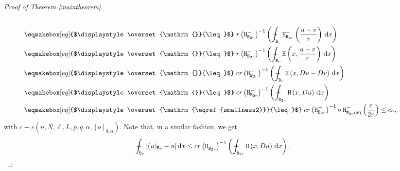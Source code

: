 \documentclass[a4paper]{amsart}
\newcommand{\eqmathbox}[2][eq]{\eqmakebox[#1]{$\displaystyle #2$}}
\theoremstyle{plain}  %
\numberwithin{equation}{section}
\def\dx{\,{\rm d}x}
\newcommand{\mint}{\mathop{\int\hskip -1,05em -\, \!\!\!}\nolimits}
\newcommand{\br}{\tx{B}_{r}}
\newcommand{\brr}{\tx{B}_{2r}}
\newcommand{\ff}{\tx{H}}
\newcommand{\tx}[1]{\textnormal{\texttt{#1}}}
\begin{document}
\begin{proof}[Proof of Theorem \ref{maintheorem}]
\begin{align}
    \notag \\ & \mathrel{\eqmathbox{\overset{\mathrm{}}{\leq}}}  r \left (\ff^{-}_{\brr} \right )^{-1}\left ( \mint_{\br} \ff^-_{\brr}\left (\frac{u-v}{r} \right )\dx \right )  \notag  \\ & \mathrel{\eqmathbox{\overset{\mathrm{}}{\leq}}}  r \left (\ff^{-}_{\brr} \right )^{-1}\left ( \mint_{\br} \ff\left (x, \frac{u-v}{r} \right )\dx \right )  \notag\\ & \mathrel{\eqmathbox{\overset{\mathrm{}}{\leq}}} cr \left (\ff^{-}_{\brr} \right )^{-1} \left (\mint_{\br} \ff\left (x, Du-Dv \right )\dx \right )\notag\\ & \mathrel{\eqmathbox{\overset{\mathrm{}}{\leq}}} cr \left (\ff^{-}_{\brr} \right )^{-1} \left (\mint_{\brr} \ff\left (x, Du \right )\dx \right ) \label{uv} \\ & \mathrel{\eqmathbox{\overset{\mathrm{\eqref{smallness2}}}{\leq}}} cr \left (\ff^{-}_{\brr} \right )^{-1} \circ \ff^-_{\tx{B}_{2r}(\tilde{x})}\left (\frac{\varepsilon}{2r}\right ) \leq c\varepsilon \label{uv2},
\end{align}
with $c \equiv c(n,N,\ell,L,p,q,\alpha,[a]_{0,\alpha})$. Note that, in a similar fashion, we get
\begin{align} \label{uu}
    \mint_{\br} |(u)_{\br}-u| \dx  \leq cr \left (\ff^{-}_{\brr} \right )^{-1} \left (\mint_{\brr} \ff\left (x, Du \right )\dx \right ). 
\end{align}

\end{proof}
\end{document}

